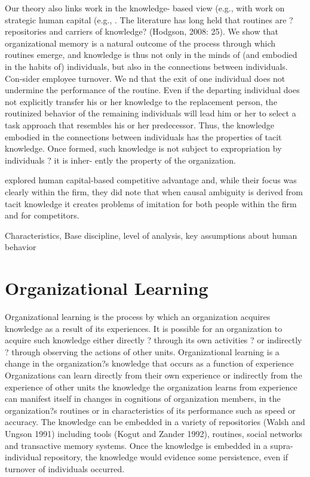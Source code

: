 \documentclass[12pt,letterpaper]{article}
\begin{document}
Our theory also links work in the knowledge- based view (e.g., \cite{Grant1996b, Kogut1992} with work on strategic human capital (e.g., \cite{Campbell2012, Coff1997}. The literature has long held that routines are ?repositories and carriers of knowledge? (Hodgson, 2008: 25). We show that organizational memory is a natural outcome of the process through which routines emerge, and knowledge is thus not only in the minds of (and embodied in the habits of) individuals, but also in the connections between individuals. Con-sider employee turnover. We  nd that the exit of one individual does not undermine the performance of the routine. Even if the departing individual does not explicitly transfer his or her knowledge to the replacement person, the routinized behavior of the remaining individuals will lead him or her to select a task approach that resembles his or her predecessor. Thus, the knowledge embodied in the connections between individuals has the properties of tacit knowledge. Once formed, such knowledge is not subject to expropriation by individuals ? it is inher- ently the property of the organization.

\cite{Coff2011} explored human capital-based competitive advantage and, while their focus was clearly within the firm, they did note that when causal ambiguity is derived from tacit knowledge it creates problems of imitation for both people within the firm and for competitors.

Characteristics, Base discipline, level of analysis, key assumptions about human behavior

\section{Organizational Learning}
Organizational learning is the process by which an organization acquires knowledge as a result of its experiences. It is possible for an organization to acquire such knowledge either directly ? through its own activities ? or indirectly ? through observing the actions of
other units. Organizational learning is a change in the organization?s knowledge that occurs as a function of experience  Organizations can learn directly from their own experience or indirectly from the experience of other units \citep{Levitt1988} the knowledge the organization learns from experience can manifest itself in changes in cognitions of organization members, in the organization?s routines or in characteristics of its performance such as speed or accuracy. The knowledge can be embedded in a variety of repositories (Walsh and Ungson 1991) including tools (Kogut and Zander 1992), routines, social networks and transactive memory systems. Once
the knowledge is embedded in a supra-individual repository, the knowledge would evidence some persistence, even if turnover of individuals occurred.
\end{document}
